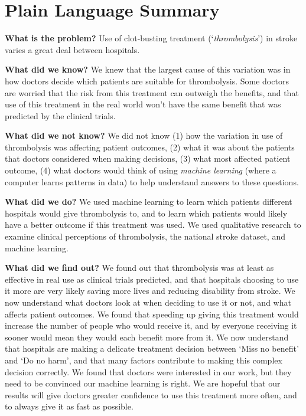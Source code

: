 \section*{Plain Language Summary}

\textbf{What is the problem?} Use of clot-busting treatment (`\textit{thrombolysis}') in stroke varies a great deal between hospitals.

\textbf{What did we know?} We knew that the largest cause of this variation was in how doctors decide which patients are suitable for thrombolysis. Some doctors are worried that the risk from this treatment can outweigh the benefits, and that use of this treatment in the real world won’t have the same benefit that was predicted by the clinical trials.

\textbf{What did we not know?} We did not know (1) how the variation in use of thrombolysis was affecting patient outcomes, (2) what it was about the patients that doctors considered when making decisions, (3) what most affected patient outcome, (4) what doctors would think of using \textit{machine learning} (where a computer learns patterns in data) to help understand answers to these questions.

\textbf{What did we do?} We used machine learning to learn which patients different hospitals would give thrombolysis to, and to learn which patients would likely have a better outcome if this treatment was used. We used qualitative research to examine clinical perceptions of thrombolysis, the national stroke dataset, and machine learning. 

\textbf{What did we find out?} We found out that thrombolysis was at least as effective in real use as clinical trials predicted, and that hospitals choosing to use it more are very likely saving more lives and reducing disability from stroke. We now understand what doctors look at when deciding to use it or not, and what affects patient outcomes. We found that speeding up giving this treatment would increase the number of people who would receive it, and by everyone receiving it sooner would mean they would each benefit more from it. We now understand that hospitals are making a delicate treatment decision between ‘Miss no benefit’ and ‘Do no harm’, and that many factors contribute to making this complex decision correctly. We found that doctors were interested in our work, but they need to be convinced our machine learning is right. We are hopeful that our results will give doctors greater confidence to use this treatment more often, and to always give it as fast as possible.